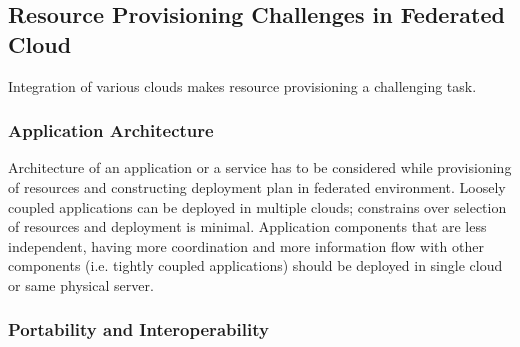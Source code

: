 \documentclass[conference]{IEEEtran}
\begin{document}
\subsection{Resource Provisioning Challenges in Federated Cloud}

Integration of various clouds makes resource provisioning a challenging task.
\subsubsection{Application Architecture}

Architecture of an application or a service has to be considered while provisioning of resources and constructing deployment plan in federated environment. Loosely coupled applications can be deployed in multiple clouds; constrains over selection of resources and deployment is minimal. Application components that are less independent, having more coordination and more information flow with other components (i.e. tightly coupled applications) should be deployed in single cloud or same physical server. 
\subsubsection{Portability and Interoperability}
\end{document}
